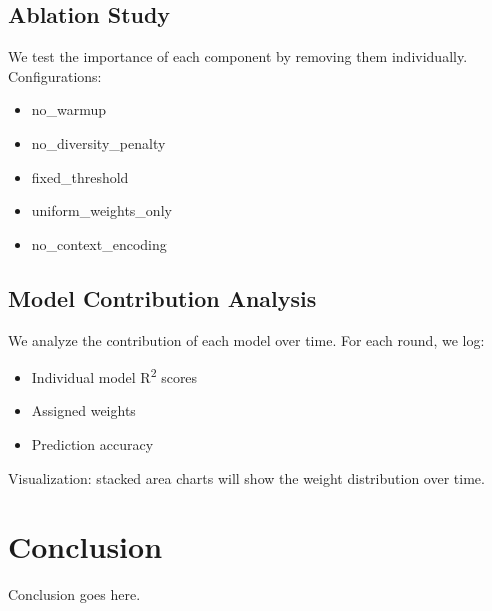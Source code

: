 \documentclass[conference]{IEEEtran}
\begin{document}
\subsection{Ablation Study}
We test the importance of each component by removing them individually.  
Configurations:
\begin{itemize}
    \item no\_warmup
    \item no\_diversity\_penalty
    \item fixed\_threshold
    \item uniform\_weights\_only
    \item no\_context\_encoding
\end{itemize}



\subsection{Model Contribution Analysis}
We analyze the contribution of each model over time.  
For each round, we log:
\begin{itemize}
    \item Individual model R\textsuperscript{2} scores
    \item Assigned weights
    \item Prediction accuracy
\end{itemize}

Visualization: stacked area charts will show the weight distribution over time.






\section{Conclusion}
Conclusion goes here.


\end{document}
